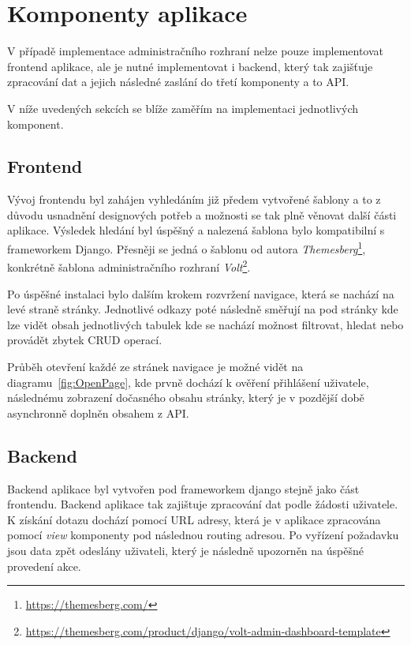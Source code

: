 \section{Komponenty aplikace}
\label{sec:implementation-components}
V případě implementace administračního rozhraní nelze pouze implementovat frontend aplikace, ale je nutné implementovat i backend, který tak zajišťuje zpracování dat a jejich následné zaslání do třetí komponenty a to API\@.

V níže uvedených sekcích se blíže zaměřím na implementaci jednotlivých komponent.

\subsection{Frontend}
\label{subsec:implementation-frontend}
Vývoj frontendu byl zahájen vyhledáním již předem vytvořené šablony a to z důvodu usnadnění designových potřeb a možnosti se tak plně věnovat další části aplikace. Výsledek hledání byl úspěšný a nalezená šablona bylo kompatibilní s frameworkem Django. Přesněji se jedná o šablonu od autora \textit{Themesberg}\footnote{\href{https://themesberg.com/}{https://themesberg.com/}}, konkrétně šablona administračního rozhraní \textit{Volt}\footnote{\href{https://themesberg.com/product/django/volt-admin-dashboard-template}{https://themesberg.com/product/django/volt-admin-dashboard-template}}.

Po úspěšné instalaci bylo dalším krokem rozvržení navigace, která se nachází na levé straně stránky. Jednotlivé odkazy poté následně směřují na pod stránky kde lze vidět obsah jednotlivých tabulek kde se nachází možnost filtrovat, hledat nebo provádět zbytek CRUD operací.

Průběh otevření každé ze stránek navigace je možné vidět na diagramu~\ref{fig:OpenPage}, kde prvně dochází k ověření přihlášení uživatele, následnému zobrazení dočasného obsahu stránky, který je v pozdější době asynchronně doplněn obsahem z API\@.


\subsection{Backend}
\label{subsec:implementation-backend}
Backend aplikace byl vytvořen pod frameworkem django stejně jako část frontendu. Backend aplikace tak zajištuje zpracování dat podle žádosti uživatele. K získání dotazu dochází pomocí URL adresy, která je v aplikace zpracována pomocí \textit{view} komponenty pod následnou routing adresou. Po vyřízení požadavku jsou data zpět odeslány uživateli, který je následně upozorněn na úspěšné provedení akce.

